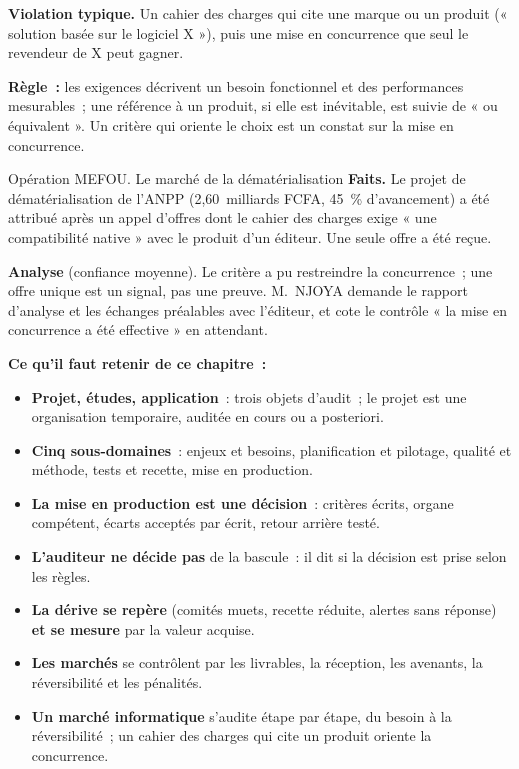 \begin{boxalert}
\textbf{Violation typique.} Un cahier des charges qui cite une marque ou un
produit (« solution basée sur le logiciel X »), puis une mise en
concurrence que seul le revendeur de X peut gagner.

\smallskip
\textbf{Règle~:} les exigences décrivent un besoin fonctionnel et des
performances mesurables~; une référence à un produit, si elle est
inévitable, est suivie de « ou équivalent ». Un critère qui oriente le choix
est un constat sur la mise en concurrence.
\end{boxalert}

\begin{boxscenario}{Opération MEFOU. Le marché de la dématérialisation}
\textbf{Faits.} Le projet de dématérialisation de l'ANPP (2,60~milliards
FCFA, 45~\% d'avancement) a été attribué après un appel d'offres dont le
cahier des charges exige « une compatibilité native » avec le produit d'un
éditeur. Une seule offre a été reçue.

\medskip
\textbf{Analyse} (confiance moyenne). Le critère a pu restreindre la
concurrence~; une offre unique est un signal, pas une preuve. M.~NJOYA
demande le rapport d'analyse et les échanges préalables avec l'éditeur, et
cote \NEK{} le contrôle « la mise en concurrence a été effective » en
attendant.
\end{boxscenario}

\separateur

\begin{boxresume}
\textbf{Ce qu'il faut retenir de ce chapitre~:}
\begin{itemize}
    \item \textbf{Projet, études, application}~: trois objets d'audit~; le
          projet est une organisation temporaire, auditée en cours ou a
          posteriori.
    \item \textbf{Cinq sous-domaines}~: enjeux et besoins, planification et
          pilotage, qualité et méthode, tests et recette, mise en
          production.
    \item \textbf{La mise en production est une décision}~: critères écrits,
          organe compétent, écarts acceptés par écrit, retour arrière testé.
    \item \textbf{L'auditeur ne décide pas} de la bascule~: il dit si la
          décision est prise selon les règles.
    \item \textbf{La dérive se repère} (comités muets, recette réduite,
          alertes sans réponse) \textbf{et se mesure} par la valeur acquise.
    \item \textbf{Les marchés} se contrôlent par les livrables, la réception,
          les avenants, la réversibilité et les pénalités.
    \item \textbf{Un marché informatique} s'audite étape par étape, du besoin à la réversibilité~; un cahier des charges qui cite un produit oriente la concurrence.
\end{itemize}
\end{boxresume}

